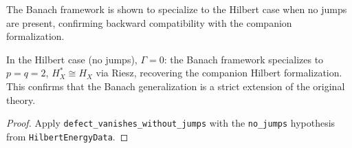 The Banach framework is shown to specialize to the Hilbert case when no jumps are present, confirming backward compatibility with the companion formalization.

\begin{theorem}\label{thm:hilbert_bridge}
\leanok
{}
In the Hilbert case (no jumps), $\Gamma = 0$: the Banach framework specializes to
$p = q = 2$, $H_X^* \cong H_X$ via Riesz, recovering the companion Hilbert formalization.
This confirms that the Banach generalization is a strict extension of the original theory.
\end{theorem}
\begin{proof}\leanok Apply \texttt{defect\_vanishes\_without\_jumps} with the \texttt{no\_jumps} hypothesis from \texttt{HilbertEnergyData}.\end{proof}

